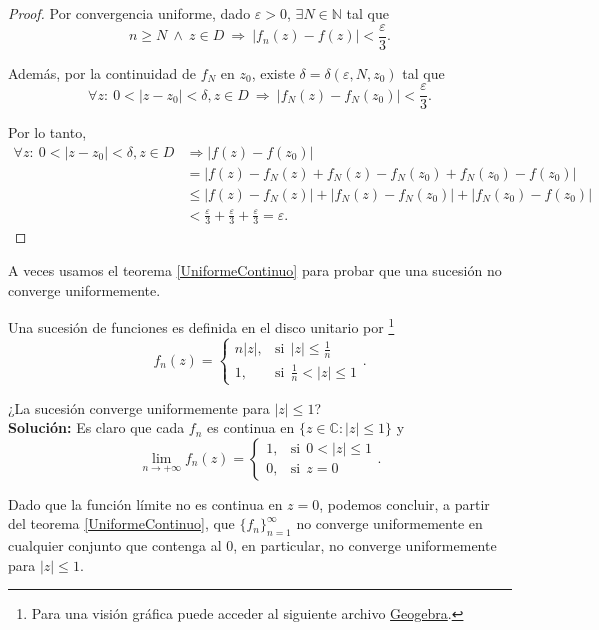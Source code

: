 \begin{proof}
Por convergencia uniforme, dado $\varepsilon > 0$, $\exists N \in \mathbb{N}$ tal que
$$n \geq N   ~\wedge~  z \in D ~\Rightarrow~ |f_n(z) - f(z)| < \frac{\varepsilon}{3}.$$

Además, por la continuidad de $f_N$ en $z_0$, existe $\delta = \delta (\varepsilon, N, z_0)$ tal que
$$\forall z: ~ 0 < |z-z_0| < \delta, z \in D ~\Rightarrow~ |f_N(z) - f_N(z_0)| < \frac{\varepsilon}{3}.$$

Por lo tanto,
\begin{align*}
\forall z:~ 0 < |z-z_0| < \delta, z \in D &\Rightarrow |f(z) - f(z_0)| \\
&= |f(z) - f_N(z) + f_N(z) - f_N(z_0) + f_N(z_0) - f(z_0)| \\
&\leq |f(z) - f_N(z)| + |f_N(z) - f_N(z_0)| + |f_N(z_0) - f(z_0)| \\
&< \frac{\varepsilon}{3} + \frac{\varepsilon}{3} + \frac{\varepsilon}{3} = \varepsilon.
\end{align*}
\end{proof}

A veces usamos el teorema \ref{UniformeContinuo} para probar que una sucesión no converge uniformemente.

\begin{ejemplo}
Una sucesión de funciones es definida en el disco unitario por \footnote{Para una visión gráfica puede acceder al siguiente archivo \href{https://www.geogebra.org/m/bedmcah3}{Geogebra}.}
$$f_n(z) =  \left\{ \begin{array}{cl}
n|z|,& \mbox{si}~~ |z| \leq \frac{1}{n} \\
1 ,& \mbox{si}~~  \frac{1}{n} < |z| \leq 1
\end{array} \right. .$$

¿La sucesión converge uniformemente para $|z| \leq 1$?
\\

\textbf{Solución:} Es claro que cada $f_n$ es continua en $\{z \in \mathbb{C} : |z| \leq 1\}$ y
$$\lim_{n \to + \infty} f_n(z) =  \left\{ \begin{array}{cl}
1,& \mbox{si}~~ 0 < |z| \leq 1 \\
0 ,& \mbox{si}~~  z = 0
\end{array} \right. .$$

Dado que la función límite no es continua en $z =0$, podemos concluir, a partir del teorema \ref{UniformeContinuo}, que $\{f_n\}_{n = 1}^{\infty}$ no converge uniformemente en cualquier conjunto que contenga al 0, en particular, no converge uniformemente para $|z| \leq 1$.
\end{ejemplo}

